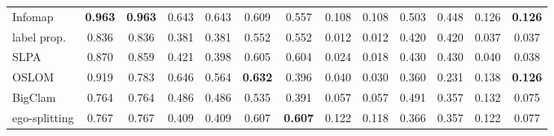 \begin{table}[t]
\begin{ruledtabular}
\begin{tabular}{lcccccccccccc}
Infomap & \textbf{0.963} & \textbf{0.963} & 0.643 & 0.643 & 0.609 & 0.557 & 0.108 & 0.108 & 0.503 & 0.448 & 0.126 & \textbf{0.126} \\
label prop. & 0.836 & 0.836 & 0.381 & 0.381 & 0.552 & 0.552 & 0.012 & 0.012 & 0.420 & 0.420 & 0.037 & 0.037 \\
SLPA & 0.870 & 0.859 & 0.421 & 0.398 & 0.605 & 0.604 & 0.024 & 0.018 & 0.430 & 0.430 & 0.040 & 0.038 \\
OSLOM & 0.919 & 0.783 & 0.646 & 0.564 & \textbf{0.632} & 0.396 & 0.040 & 0.030 & 0.360 & 0.231 & 0.138 & \textbf{0.126} \\
BigClam & 0.764 & 0.764 & 0.486 & 0.486 & 0.535 & 0.391 & 0.057 & 0.057 & 0.491 & 0.357 & 0.132 & 0.075 \\
ego-splitting & 0.767 & 0.767 & 0.409 & 0.409 & 0.607 & \textbf{0.607} & 0.122 & 0.118 & 0.366 & 0.357 & 0.122 & 0.077 \\
\end{tabular}
\end{ruledtabular}
\end{table}

